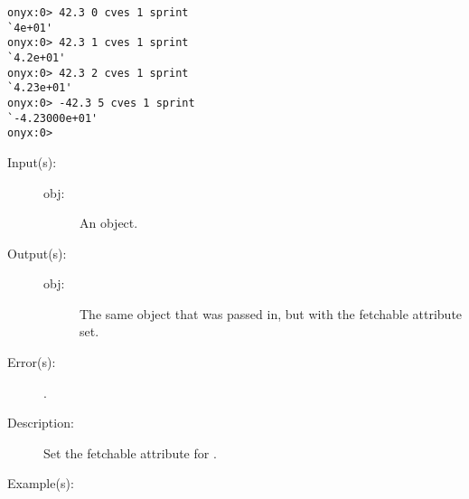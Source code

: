 \begin{description}
\begin{description}
\begin{verbatim}
onyx:0> 42.3 0 cves 1 sprint
`4e+01'
onyx:0> 42.3 1 cves 1 sprint
`4.2e+01'
onyx:0> 42.3 2 cves 1 sprint
`4.23e+01'
onyx:0> -42.3 5 cves 1 sprint
`-4.23000e+01'
onyx:0>
		\end{verbatim}
	\end{description}
\label{systemdict:cvf}
\item[{\onyxop{obj}{cvf}{obj}}: ]
	\begin{description}\item[]
	\item[Input(s): ]
		\begin{description}\item[]
		\item[obj: ]
			An object.
		\end{description}
	\item[Output(s): ]
		\begin{description}\item[]
		\item[obj: ]
			The same object that was passed in, but with the
			fetchable attribute set.
		\end{description}
	\item[Error(s): ]
		\begin{description}\item[]
		\item[.]
		\end{description}
	\item[Description: ]
		Set the fetchable attribute for .
	\item[Example(s): ]\begin{verbatim}


\end{verbatim}
\end{description}
\end{description}
